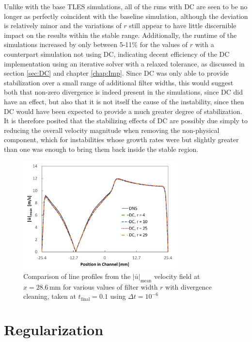 Unlike with the base TLES simulations, all of the runs with DC are seen to be no longer as perfectly coincident with the baseline simulation, although the deviation is relatively minor and the variations of $r$ still appear to have little discernible impact on the results within the stable range. Additionally, the runtime of the simulations increased by only between 5-11\% for the values of $r$ with a counterpart simulation not using DC, indicating decent efficiency of the DC implementation using an iterative solver with a relaxed tolerance, as discussed in section \ref{sec:DC} and chapter \ref{chap:Imp}. Since DC was only able to provide stabilization over a small range of additional filter widths, this would suggest both that non-zero divergence is indeed present in the simulations, since DC did have an effect, but also that it is not itself the cause of the instability, since then DC would have been expected to provide a much greater degree of stabilization. It is therefore posited that the stabilizing effects of DC are possibly due simply to reducing the overall velocity magnitude when removing the non-physical component, which for instabilities whose growth rates were but slightly greater than one was enough to bring them back inside the stable region.

\begin{figure}[!tb]
\centering
\includegraphics[width=0.75\textwidth]{figures/line_data_DC.pdf}
\caption{Comparison of line profiles from the $|\bar{u}|_{\mathrm{mean}}$ velocity field at $x=28.6\,\mathrm{mm}$ for various values of filter width $r$ with divergence cleaning, taken at $t_\mathrm{final}=0.1$ using $\Delta t=10^{-6}$}
\label{fig:line_data_DC}
\end{figure}

\section{Regularization}

